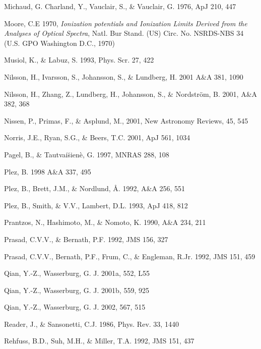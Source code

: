 \documentclass{aa}
\begin{document}
\begin{thebibliography}{}
    Michaud, G. Charland, Y., Vauclair, S.,
   \& Vauclair, G. 1976, ApJ 210, 447 

    Moore, C.E 1970, {\it Ionization
   potentials and Ionization Limits Derived from the Analyses of
   Optical Spectra}, Natl. Bur Stand. (US) Circ. No. NSRDS-NBS 34
   (U.S. GPO Washington D.C., 1970) 

     Musiol, K., \& Labuz, S. 1993, Phys. Scr. 27, 422

    Nilsson, H., Ivarsson, S., Johansson,
   S., \& Lundberg, H. 2001 A\&A 381, 1090 

     Nilsson, H., Zhang, Z., Lundberg, H.,
    Johansson, S., \& Nordstr\"om, B. 2001, A\&A 382, 368

     Nissen, P., Primas, F., \& Asplund, M.,
    2001, New Astronomy Reviews, 45, 545 

     Norris, J.E., Ryan, S.G., \& Beers,
    T.C. 2001, ApJ 561, 1034 

     Pagel, B., \& Tautvai\u{s}ien\`e, G. 1997, MNRAS
    288, 108

     Plez, B. 1998 A\&A 337, 495

     Plez, B., Brett, J.M., \& Nordlund, \AA. 1992,
   A\&A 256, 551

     Plez, B., Smith, \& V.V., Lambert,
    D.L. 1993, ApJ 418, 812 

     Prantzos, N., Hashimoto, M., \& Nomoto, K.
    1990, A\&A 234, 211
   
     Prasad, C.V.V., \& Bernath, P.F. 1992, JMS 156, 327

     Prasad, C.V.V., Bernath, P.F., Frum, C., \&
Engleman, R.Jr. 1992, JMS 151, 459

    Qian, Y.-Z., Wasserburg, G. J. 2001a, 552,
   L55

    Qian, Y.-Z., Wasserburg, G. J. 2001b, 559,
   925

    Qian, Y.-Z., Wasserburg, G. J. 2002, 567, 515


    Reader, J., \& Sansonetti, C.J. 1986,
    Phys. Rev. 33, 1440

     Rehfuss, B.D., Suh, M.H., \& Miller, T.A. 1992,
JMS 151, 437


\end{thebibliography}
\end{document}
